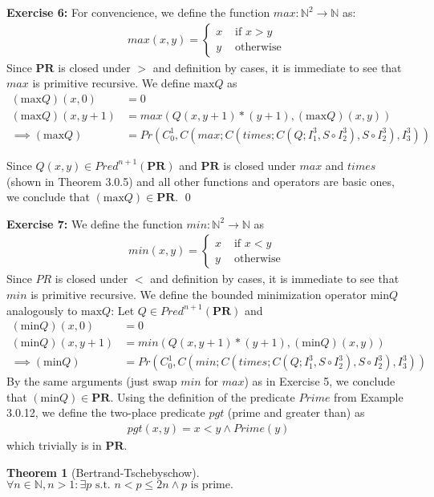 \documentclass [11pt]{article}
\newcommand{\PR}{\textbf{PR}}
\newtheorem{theorem}{Theorem}
\begin{document}
\bigskip
\noindent
\textbf{Exercise 6:}
For convencience, we define the function $max: \mathbb{N}^2 \rightarrow \mathbb{N}$ as:
\begin{align*}
max(x,y) = \begin{cases}
           x & \text{ if } x > y \\
           y & \text{ otherwise }
           \end{cases}
\end{align*}
Since $\PR$ is closed under $>$ and definition by cases, it is immediate to see that $max$ is primitive recursive.
We define $\text{max}Q$ as
\begin{align*}
(\text{max}Q)(x,0) &= 0 \\
(\text{max}Q)(x,y+1) &= max(Q(x,y+1) * (y+1), (\text{max}Q)(x,y)) \\
\implies (\text{max}Q) &= Pr(C^1_0, C(max; C(times; C(Q; I^3_1, S \circ I^3_2), S \circ I^3_2) , I^3_3))
\end{align*}

Since $Q(x,y) \in Pred^{n+1}(\PR)$ and $\PR$ is closed under $max$ and $times$ (shown in Theorem 3.0.5) and all other functions and operators are basic ones, we conclude that $(\text{max}Q) \in \PR$.
\qed

\bigskip
\noindent
\textbf{Exercise 7:}
We define the function $min: \mathbb{N}^2 \rightarrow \mathbb{N}$ as 
\begin{align*}
min(x,y) = \begin{cases}
           x & \text{ if } x < y \\
           y & \text{ otherwise }
           \end{cases}
\end{align*}
Since $PR$ is closed under $<$ and definition by cases, it is immediate to see that $min$ is primitive recursive.
We define the bounded minimization operator $\text{min}Q$ analogously to $\text{max}Q$: 
Let $Q \in Pred^{n+1}(\PR)$ and 
\begin{align*}
(\text{min}Q)(x,0) &= 0 \\
(\text{min}Q)(x,y+1) &= min(Q(x,y+1) * (y+1), (\text{min}Q)(x,y)) \\
\implies (\text{min}Q) &= Pr(C^1_0, C(min; C(times; C(Q; I^3_1, S \circ I^3_2), S \circ I^3_2) , I^3_3))
\end{align*}
By the same arguments (just swap $min$ for $max$) as in Exercise 5, we conclude that $(\text{min}Q) \in \PR$. 
Using the definition of the predicate $Prime$ from Example 3.0.12, we define the two-place predicate $pgt$ (prime and greater than) as
\begin{align*}
pgt(x,y) = x < y \land Prime(y) 
\end{align*}
which trivially is in $\PR$.
\begin{theorem}[Bertrand-Tschebyschow]
$\forall n\in \mathbb{N}, n > 1 : \exists p \text{ s.t.~}  n < p \leq 2n \land p \text{ is prime.}$
\end{theorem}
\end{document}
